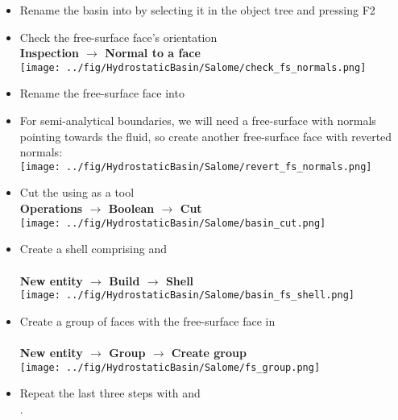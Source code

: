 \documentclass{../GPUSPHtemplate}
\begin{document}
\begin{enumerate}
\begin{itemize}
  \item Rename the basin into  by selecting it in the object tree and pressing F2
  \item Check the free-surface face's orientation\\
    \textbf{Inspection $\to$ Normal to a face}\\
    \texttt{[image: ../fig/HydrostaticBasin/Salome/check\_fs\_normals.png]}
  \item Rename the free-surface face into 
  \item For semi-analytical boundaries, we will need a free-surface with normals pointing towards the fluid, so
    create another free-surface face with reverted normals:\\
    \texttt{[image: ../fig/HydrostaticBasin/Salome/revert\_fs\_normals.png]}
  \item Cut the  using  as a tool\\
    \textbf{Operations $\to$ Boolean $\to$ Cut}\\
    \texttt{[image: ../fig/HydrostaticBasin/Salome/basin\_cut.png]}
  \item Create a shell comprising  and \\
    \\
    \textbf{New entity $\to$ Build $\to$ Shell}\\
    \texttt{[image: ../fig/HydrostaticBasin/Salome/basin\_fs\_shell.png]}
  \item Create a group of faces with the free-surface face in \\
    \\
    \textbf{New entity $\to$ Group $\to$ Create group}\\
    \texttt{[image: ../fig/HydrostaticBasin/Salome/fs\_group.png]}
  \item Repeat the last three steps with  and \\
    .


\end{itemize}
\end{enumerate}
\end{document}
